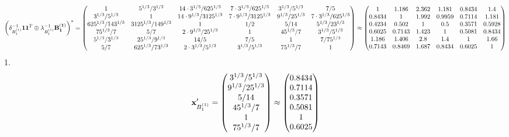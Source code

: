 \documentclass[10pt,a4paper]{article}
\begin{document}
	\[
		\left(\delta_{B_1^{(1)}}^{-1}\bold{11}^T \oplus \lambda_{B_1^{(1)}}^{-1}\bold{B_1^{(1)}}\right)^* = 
		\begin{pmatrix}
			{1}{} & {{5^ {1 / 3}}} / {{3^ {1 / 3}}} & {{14} \cdot {3^ {1 / 3}}} / {{625^ {1 / 3}}} & {{7} \cdot {3^ {1 / 3}}} / {{625^ {1 / 3}}} & {{3^ {1 / 3}}} / {{5^ {1 / 3}}} & {{7}} / {{5}} \\
			{{3^ {1 / 3}}} / {{5^ {1 / 3}}} & {1}{} & {{14} \cdot {9^ {1 / 3}}} / {{3125^ {1 / 3}}} & {{7} \cdot {9^ {1 / 3}}} / {{3125^ {1 / 3}}} & {{9^ {1 / 3}}} / {{25^ {1 / 3}}} & {{7} \cdot {3^ {1 / 3}}} / {{625^ {1 / 3}}} \\
			{{625^ {1 / 3}}} / {{14}{3^ {1 / 3}}} & {{3125^ {1 / 3}}} / {{14}{9^ {1 / 3}}} & {1}{} & {1} / {{2}} & {{5}} / {{14}} & {{5^ {1 / 3}}} / {{2}{3^ {1 / 3}}} \\
			{{75^ {1 / 3}}} / {{7}} & {{5}} / {{7}} & {{2} \cdot {9^ {1 / 3}}} / {{25^ {1 / 3}}} & {1}{} & {{45^ {1 / 3}}} / {{7}} & {{3^ {1 / 3}}} / {{5^ {1 / 3}}} \\
			{{5^ {1 / 3}}} / {{3^ {1 / 3}}} & {{25^ {1 / 3}}} / {{9^ {1 / 3}}} & {{14}} / {{5}} & {{7}} / {{5}} & {1}{} & {{7}} / {{75^ {1 / 3}}} \\
			{{5}} / {{7}} & {{625^ {1 / 3}}} / {{7}{3^ {1 / 3}}} & {{2} \cdot {3^ {1 / 3}}} / {{5^ {1 / 3}}} & {{3^ {1 / 3}}} / {{5^ {1 / 3}}} & {{75^ {1 / 3}}} / {{7}} & {1}{} \\
		\end{pmatrix}
		\approx
		\begin{pmatrix}
			1        & 1.186    & 2.362    & 1.181    & 0.8434   & 1.4      \\
			0.8434   & 1        & 1.992    & 0.9959   & 0.7114   & 1.181    \\
			0.4234   & 0.502    & 1        & 0.5      & 0.3571   & 0.5928   \\
			0.6025   & 0.7143   & 1.423    & 1        & 0.5081   & 0.8434   \\
			1.186    & 1.406    & 2.8      & 1.4      & 1        & 1.66     \\
			0.7143   & 0.8469   & 1.687    & 0.8434   & 0.6025   & 1        \\
		\end{pmatrix}
	\]
	1.
	\[
		\bold{x}'_{B_1^{(1)}} = 
		\begin{pmatrix}
			{{3^ {1 / 3}}} / {{5^ {1 / 3}}} \\
			{{9^ {1 / 3}}} / {{25^ {1 / 3}}} \\
			{{5}} / {{14}} \\
			{{45^ {1 / 3}}} / {{7}} \\
			{1}{} \\
			{{75^ {1 / 3}}} / {{7}} \\
		\end{pmatrix}
		\approx
		\begin{pmatrix}
			0.8434   \\
			0.7114   \\
			0.3571   \\
			0.5081   \\
			1        \\
			0.6025   \\
		\end{pmatrix}
	\]
\end{document}
